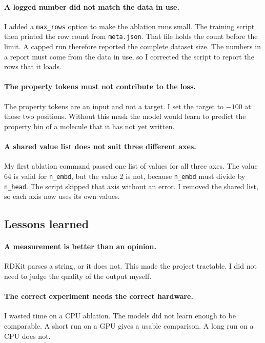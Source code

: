 \documentclass[11pt,a4paper]{article}
\newcommand{\code}[1]{\texttt{#1}}
\begin{document}
\paragraph{A logged number did not match the data in use.} I added a \code{max\_rows} option to
make the ablation runs small. The training script then printed the row count from
\code{meta.json}. That file holds the count before the limit. A capped run therefore reported the
complete dataset size. The numbers in a report must come from the data in use, so I corrected the
script to report the rows that it loads.

\paragraph{The property tokens must not contribute to the loss.} The property tokens are an input
and not a target. I set the target to $-100$ at those two positions. Without this mask the model
would learn to predict the property bin of a molecule that it has not yet written.

\paragraph{A shared value list does not suit three different axes.} My first ablation command
passed one list of values for all three axes. The value 64 is valid for \code{n\_embd}, but the
value 2 is not, because \code{n\_embd} must divide by \code{n\_head}. The script skipped that axis
without an error. I removed the shared list, so each axis now uses its own values.

\subsection{Lessons learned}

\paragraph{A measurement is better than an opinion.} RDKit parses a string, or it does not. This
made the project tractable. I did not need to judge the quality of the output myself.

\paragraph{The correct experiment needs the correct hardware.} I wasted time on a CPU ablation.
The models did not learn enough to be comparable. A short run on a GPU gives a usable comparison.
A long run on a CPU does not.
\end{document}
